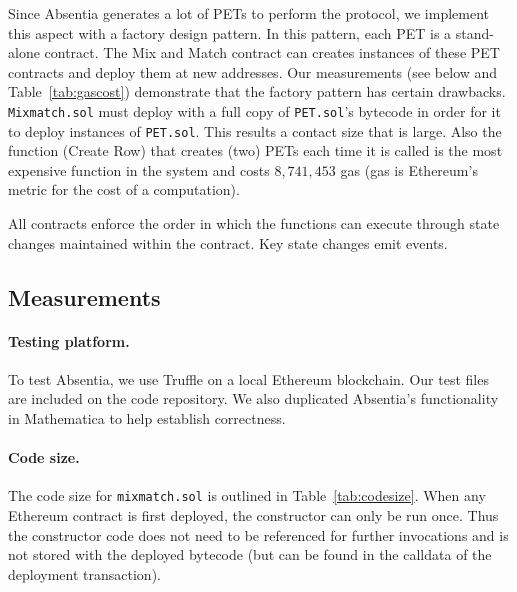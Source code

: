 Since Absentia generates a lot of PETs to perform the protocol, we implement this aspect with a factory design pattern. In this pattern, each PET is a stand-alone contract. The Mix and Match contract can creates instances of these PET contracts and deploy them at new addresses. Our measurements (see below and Table~\ref{tab:gascost}) demonstrate that the factory pattern has certain drawbacks. \texttt{Mixmatch.sol} must deploy with a full copy of \texttt{PET.sol}'s bytecode in order for it to deploy instances of \texttt{PET.sol}. This results a contact size that is large. Also the function (Create Row) that creates (two) PETs each time it is called is the most expensive function in the system and costs $8,741,453$ gas (gas is Ethereum's metric for the cost of a computation). 

All contracts enforce the order in which the functions can execute through state changes maintained within the contract. Key state changes emit events. 


\subsection{Measurements}


\paragraph{Testing platform.}  To test Absentia, we use Truffle on a local Ethereum blockchain. Our test files are included on the code repository. We also duplicated Absentia's functionality in Mathematica to help establish correctness.




\paragraph{Code size.} 

The code size for \texttt{mixmatch.sol} is outlined in Table~\ref{tab:codesize}. When any Ethereum contract is first deployed, the constructor can only be run once. Thus the constructor code does not need to be referenced for further invocations and is not stored with the deployed bytecode (but can be found in the calldata of the deployment transaction). 

